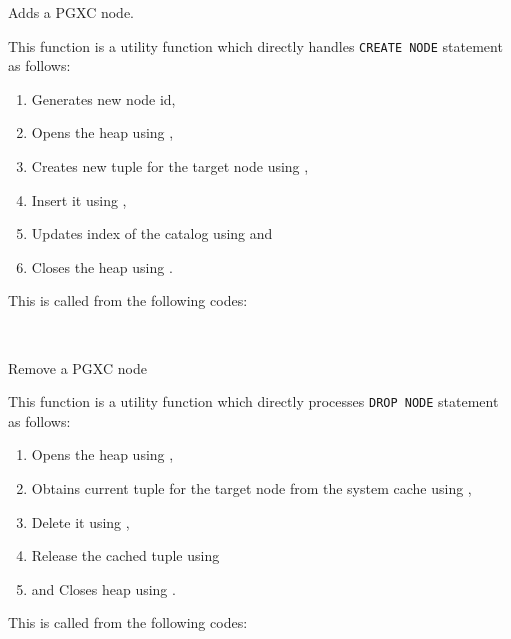   
    Adds a PGXC node.
    
    This function is a utility function which directly handles \texttt{CREATE NODE} statement as follows:
    
	\begin{enumerate}
		\item Generates new node id,
		\item Opens the heap using ,
		\item Creates new tuple for the target node using ,
		\item Insert it using ,
		\item Updates index of the catalog using  and
		\item Closes the heap using .
	\end{enumerate}
    
    This is called from the following codes:
    
    \FuncRefHdr
		\\ \hline
    \FuncRefTrailor
  
  
    Remove a PGXC node
    
    This function is a utility function which directly processes \texttt{DROP NODE} statement as follows:
    
	\begin{enumerate}
		\item Opens the heap using ,
		\item Obtains current tuple for the target node from the system cache using ,
		\item Delete it using ,
		\item Release the cached tuple using 
		\item and Closes heap using .
	\end{enumerate}
    
    This is called from the following codes:
    
    \FuncRefHdr
		\\ \hline
    \FuncRefTrailor



